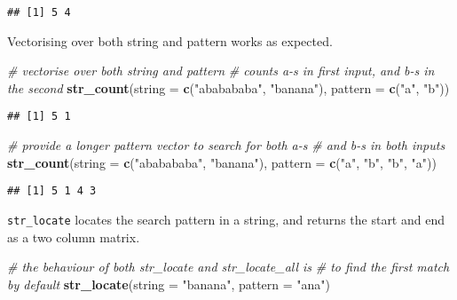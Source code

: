 \documentclass[
]{book}
\newenvironment{Shaded}{}{}
\newcommand{\CommentTok}[1]{\textcolor[rgb]{0.38,0.63,0.69}{\textit{#1}}}
\newcommand{\DataTypeTok}[1]{\textcolor[rgb]{0.56,0.13,0.00}{#1}}
\newcommand{\KeywordTok}[1]{\textcolor[rgb]{0.00,0.44,0.13}{\textbf{#1}}}
\newcommand{\NormalTok}[1]{#1}
\newcommand{\StringTok}[1]{\textcolor[rgb]{0.25,0.44,0.63}{#1}}
\begin{document}
\begin{verbatim}
## [1] 5 4
\end{verbatim}

Vectorising over both string and pattern works as expected.

\begin{Shaded}
\begin{Highlighting}[]
\CommentTok{# vectorise over both string and pattern}
\CommentTok{# counts a-s in first input, and b-s in the second}
\KeywordTok{str_count}\NormalTok{(}\DataTypeTok{string =} \KeywordTok{c}\NormalTok{(}\StringTok{"ababababa"}\NormalTok{, }\StringTok{"banana"}\NormalTok{),}
          \DataTypeTok{pattern =} \KeywordTok{c}\NormalTok{(}\StringTok{"a"}\NormalTok{, }\StringTok{"b"}\NormalTok{))}
\end{Highlighting}
\end{Shaded}

\begin{verbatim}
## [1] 5 1
\end{verbatim}

\begin{Shaded}
\begin{Highlighting}[]
\CommentTok{# provide a longer pattern vector to search for both a-s}
\CommentTok{# and b-s in both inputs}
\KeywordTok{str_count}\NormalTok{(}\DataTypeTok{string =} \KeywordTok{c}\NormalTok{(}\StringTok{"ababababa"}\NormalTok{, }\StringTok{"banana"}\NormalTok{),}
          \DataTypeTok{pattern =} \KeywordTok{c}\NormalTok{(}\StringTok{"a"}\NormalTok{, }\StringTok{"b"}\NormalTok{,}
                      \StringTok{"b"}\NormalTok{, }\StringTok{"a"}\NormalTok{))}
\end{Highlighting}
\end{Shaded}

\begin{verbatim}
## [1] 5 1 4 3
\end{verbatim}

\texttt{str\_locate} locates the search pattern in a string, and returns the start and end as a two column matrix.

\begin{Shaded}
\begin{Highlighting}[]
\CommentTok{# the behaviour of both str_locate and str_locate_all is}
\CommentTok{# to find the first match by default}
\KeywordTok{str_locate}\NormalTok{(}\DataTypeTok{string =} \StringTok{"banana"}\NormalTok{, }\DataTypeTok{pattern =} \StringTok{"ana"}\NormalTok{)}
\end{Highlighting}
\end{Shaded}
\end{document}

